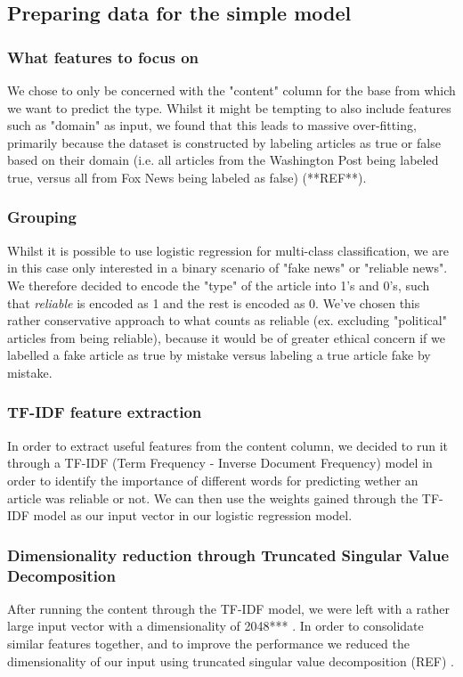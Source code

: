 \documentclass{article}
\begin{document}
\subsection{Preparing data for the simple model}
\subsubsection{What features to focus on}
We chose to only be concerned with the "content" column for the base from which we want to predict the type. Whilst it
might be tempting to also include features such as "domain" as input, we found that this leads to massive over-fitting,
primarily because the dataset is constructed by labeling articles as true or false based on their domain (i.e. all
articles from the Washington Post being labeled true, versus all from Fox News being labeled as false) (**REF**).
\subsubsection{Grouping}
Whilst it is possible to use logistic regression for multi-class classification, we are in this case only interested in
a binary scenario of "fake news" or "reliable news". We therefore decided to encode the "type" of the article into 1's
and 0's, such that \textit{reliable} is encoded as 1 and the rest is encoded as 0. We've chosen this rather
conservative approach to what counts as reliable (ex. excluding "political" articles from being reliable), because it
would be of greater ethical concern if we labelled a fake article as true by mistake versus labeling a true article
fake by mistake.

\subsubsection{TF-IDF feature extraction}
In order to extract useful features from the content column, we decided to run it through a TF-IDF (Term
Frequency - Inverse Document Frequency) model in order to identify the importance of different words for predicting
wether an article was reliable or not. We can then use the weights gained through the TF-IDF model as our input vector
in our logistic regression model. 

\subsubsection{Dimensionality reduction through Truncated Singular Value Decomposition}
After running the content through the TF-IDF model, we were left with a rather large input vector with a dimensionality
of 2048***
. In order to consolidate similar features together, and to improve the performance we reduced the
dimensionality of our input using truncated singular value decomposition (REF) .
\end{document}
